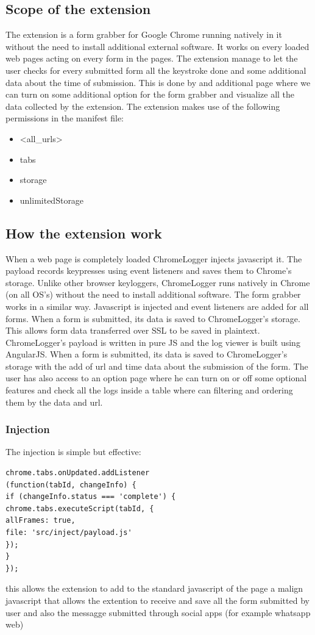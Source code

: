 \documentclass[12pt]{article}
\begin{document}
\begin{multicols}{2}
\subsection*{Scope of the extension}
The extension is a form grabber for Google Chrome running natively in it without the need to install additional external software. It works on every loaded web pages acting on every form in the pages.
The extension manage to let the user checks for every submitted form all the keystroke done and some additional data about the time of submission. This is done by and additional page where we can turn on some additional option for the form grabber and visualize all the data collected by the extension.
The extension makes use of the following permissions in the manifest file:
\begin{itemize}
	\item  <all\_urls>
	\item  tabs
	\item  storage
	\item  unlimitedStorage
\end{itemize}
\subsection*{How the extension work}
When a web page is completely loaded ChromeLogger injects javascript it. The payload records keypresses using event listeners and saves them to Chrome's storage. Unlike other browser keyloggers, ChromeLogger runs natively in Chrome (on all OS's) without the need to install additional software.
The form grabber works in a similar way. Javascript is injected and event listeners are added for all forms. When a form is submitted, its data is saved to ChromeLogger's storage. This allows form data transferred over SSL to be saved in plaintext.
ChromeLogger's payload is written in pure JS and the log viewer is built using AngularJS. When a form is submitted, its data is saved to ChromeLogger's storage with the add of url and time data about the submission of the form.
The user has also access to an option page where he can turn on or off some optional features and check all the logs inside a table where can filtering and ordering them by the data and url.
\subsubsection*{Injection}
The injection is simple but effective:
\begin{lstlisting}
chrome.tabs.onUpdated.addListener
(function(tabId, changeInfo) {
if (changeInfo.status === 'complete') {
chrome.tabs.executeScript(tabId, {
allFrames: true, 
file: 'src/inject/payload.js'
});
}
});
\end{lstlisting}
this allows the extension to add to the standard javascript of the page a malign javascript that allows the extention to receive and save all the form submitted by user and also the messagge submitted through social apps (for example whatsapp web)

\end{multicols}
\end{document}
